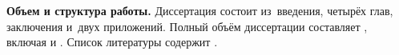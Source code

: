 \newcommand{\actuality}{}
\newcommand{\progress}{}
\newcommand{\aim}{{\textbf\aimTXT}}
\newcommand{\tasks}{\textbf{\tasksTXT} }
\newcommand{\novelty}{\textbf{\noveltyTXT}}
\newcommand{\influence}{\textbf{\influenceTXT}}
\newcommand{\methods}{\textbf{\methodsTXT}}
\newcommand{\defpositions}{\textbf{\defpositionsTXT}}
\newcommand{\reliability}{\textbf{\reliabilityTXT}}
\newcommand{\probation}{\textbf{\probationTXT}}
\newcommand{\contribution}{\textbf{\contributionTXT}}
\newcommand{\publications}{\textbf{\publicationsTXT}}



\textbf{Объем и структура работы.} Диссертация состоит из~введения, четырёх глав, заключения и~двух приложений.
%
Полный объём диссертации составляет
, включая
 и
.   Список литературы содержит  
.
